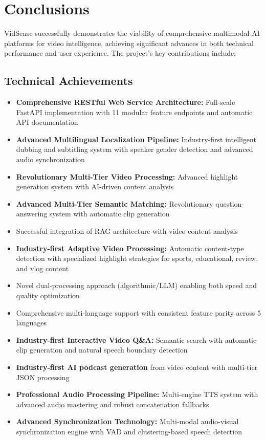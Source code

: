\documentclass{bscs}
\begin{document}
\section{Conclusions}

VidSense successfully demonstrates the viability of comprehensive multimodal AI platforms for video intelligence, achieving significant advances in both technical performance and user experience. The project's key contributions include:

\subsection{Technical Achievements}

\begin{itemize}
\item \textbf{Comprehensive RESTful Web Service Architecture:} Full-scale FastAPI implementation with 11 modular feature endpoints and automatic API documentation
\item \textbf{Advanced Multilingual Localization Pipeline:} Industry-first intelligent dubbing and subtitling system with speaker gender detection and advanced audio synchronization
\item \textbf{Revolutionary Multi-Tier Video Processing:} Advanced highlight generation system with AI-driven content analysis
\item \textbf{Advanced Multi-Tier Semantic Matching:} Revolutionary question-answering system with automatic clip generation
\item Successful integration of RAG architecture with video content analysis
\item \textbf{Industry-first Adaptive Video Processing:} Automatic content-type detection with specialized highlight strategies for sports, educational, review, and vlog content
\item Novel dual-processing approach (algorithmic/LLM) enabling both speed and quality optimization
\item Comprehensive multi-language support with consistent feature parity across 5 languages
\item \textbf{Industry-first Interactive Video Q\&A:} Semantic search with automatic clip generation and natural speech boundary detection
\item \textbf{Industry-first AI podcast generation} from video content with multi-tier JSON processing
\item \textbf{Professional Audio Processing Pipeline:} Multi-engine TTS system with advanced audio mastering and robust concatenation fallbacks
\item \textbf{Advanced Synchronization Technology:} Multi-modal audio-visual synchronization engine with VAD and clustering-based speech detection
\end{itemize}
\end{document}

